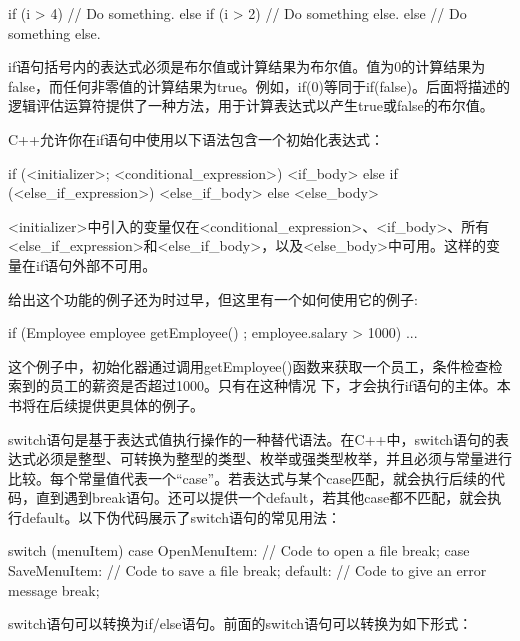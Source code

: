 \begin{cpp}
if (i > 4) {
    // Do something.
} else if (i > 2) {
    // Do something else.
} else {
    // Do something else.
}
\end{cpp}

if语句括号内的表达式必须是布尔值或计算结果为布尔值。值为0的计算结果为false，而任何非零值的计算结果为true。例如，if(0)等同于if(false)。后面将描述的逻辑评估运算符提供了一种方法，用于计算表达式以产生true或false的布尔值。


C++允许你在if语句中使用以下语法包含一个初始化表达式：

\begin{cpp}
if (<initializer>; <conditional_expression>) {
    <if_body>
} else if (<else_if_expression>) {
    <else_if_body>
} else {
    <else_body>
}
\end{cpp}

<initializer>中引入的变量仅在<conditional\_expression>、<if\_body>、所有<else\_if\_expression>和<else\_if\_body>，以及<else\_body>中可用。这样的变量在if语句外部不可用。

给出这个功能的例子还为时过早，但这里有一个如何使用它的例子:

\begin{cpp}
if (Employee employee { getEmployee() }; employee.salary > 1000) { ... }
\end{cpp}

这个例子中，初始化器通过调用getEmployee()函数来获取一个员工，条件检查检索到的员工的薪资是否超过1000。只有在这种情况 下，才会执行if语句的主体。本书将在后续提供更具体的例子。


switch语句是基于表达式值执行操作的一种替代语法。在C++中，switch语句的表达式必须是整型、可转换为整型的类型、枚举或强类型枚举，并且必须与常量进行比较。每个常量值代表一个“case”。若表达式与某个case匹配，就会执行后续的代码，直到遇到break语句。还可以提供一个default，若其他case都不匹配，就会执行default。以下伪代码展示了switch语句的常见用法：

\begin{cpp}
switch (menuItem) {
    case OpenMenuItem:
        // Code to open a file
        break;
    case SaveMenuItem:
        // Code to save a file
        break;
    default:
        // Code to give an error message
        break;
}
\end{cpp}

switch语句可以转换为if/else语句。前面的switch语句可以转换为如下形式：

